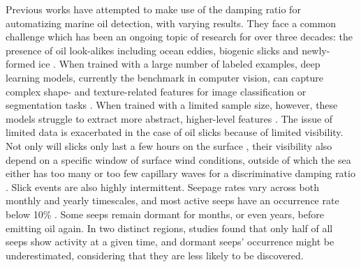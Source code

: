 \documentclass[lettersize,journal]{IEEEtran}
\begin{document}
Previous works have attempted to make use of the damping ratio for automatizing marine oil detection, with varying results. They face a common challenge which has been an ongoing topic of research for over three decades: 
the presence of oil look-alikes including ocean eddies, biogenic slicks and newly-formed ice \cite{johanssonCanMineralOil2020,hovlandSlickDetectionSAR1994,alpersOilsSurfactants2004,alpersOilSpillDetection2017}. 
When trained with a large number of labeled examples, deep learning models, currently the benchmark in computer vision, can capture complex shape- and texture-related features for image classification or segmentation tasks 
\cite{goodfellowDeepLearning2016}. When trained with a limited sample size, however, these models struggle to extract more abstract, higher-level features
\cite{bengioDeepLearningRepresentations2012}. The issue of limited data is exacerbated in the case of oil slicks because of limited visibility. Not only will slicks only last a few hours on the surface 
\cite{jatiaultMonitoringNaturalOil2017,daneshgaraslHindcastModelingOil2017,oreillyDistributionMagnitudeVariability2022}, their visibility also depend on a specific window of surface wind conditions, outside of which the sea 
either has too many or too few capillary waves for a discriminative damping ratio \cite{quigleyInvestigationDampingRatio2023,sausDetectionDelineationProduced2021,gadeImagingBiogenicAnthropogenic1998}. 
\IEEEpubidadjcol  
Slick events are also highly intermittent. Seepage rates vary across both monthly and yearly timescales, and most active seeps have an occurrence rate below 10\% 
\cite{jatiaultNaturalOilSeep2024,oreillyDistributionMagnitudeVariability2022}. Some seeps remain dormant for months, or even years, before emitting oil again. In two distinct regions, studies found that 
only half of all seeps show activity at a given time\cite{jatiaultMonitoringNaturalOil2017,garcia-pinedaRemotesensingEvaluationGeophysical2010}, and dormant seeps' occurrence might be underestimated, 
considering that they are less likely to be discovered.
\end{document}
